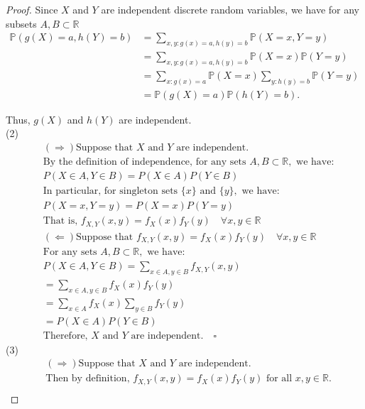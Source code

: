 \documentclass[letterpaper, 11pt]{article}
\newcommand{\1}{\mathds{1}}	%
\theoremstyle{definition}
\begin{document}
\begin{proof}
    Since \(X\) and \(Y\) are independent discrete random variables, we have for any subsets \(A,B \subset \mathbb{R}\)
    \begin{align*}
        \mathbb{P}(g(X) = a, h(Y) = b) &= \sum_{x,y: g(x)=a,h(y)=b} \mathbb{P}(X = x, Y = y) \\
        &= \sum_{x,y: g(x)=a,h(y)=b} \mathbb{P}(X = x)\mathbb{P}(Y = y) \\
        &= \sum_{x: g(x)=a} \mathbb{P}(X = x) \sum_{y: h(y)=b} \mathbb{P}(Y = y) \\
        &= \mathbb{P}(g(X) = a)\mathbb{P}(h(Y) = b).
        \end{align*}

Thus, \(g(X)\) and \(h(Y)\) are independent.
\\(2)
\begin{align*}
&(\Rightarrow) \text{Suppose that } X \text{ and } Y \text{ are independent.}\\
&\text{By the definition of independence, for any sets } A, B \subset \mathbb{R}, \text{ we have:}\\
&P(X \in A, Y \in B) = P(X \in A)P(Y \in B)\\
&\text{In particular, for singleton sets } \{x\} \text{ and } \{y\}, \text{ we have:}\\
&P(X = x, Y = y) = P(X = x)P(Y = y)\\
&\text{That is, } f_{X,Y}(x,y) = f_X(x)f_Y(y) \quad \forall x,y \in \mathbb{R}\\
&(\Leftarrow) \text{Suppose that } f_{X,Y}(x,y) = f_X(x)f_Y(y) \quad \forall x,y \in \mathbb{R}\\
&\text{For any sets } A, B \subset \mathbb{R}, \text{ we have:}\\
&P(X \in A, Y \in B) = \sum_{x \in A, y \in B} f_{X,Y}(x,y)\\
&= \sum_{x \in A, y \in B} f_X(x)f_Y(y)\\
&= \sum_{x \in A} f_X(x) \sum_{y \in B} f_Y(y)\\
&= P(X \in A)P(Y \in B)\\
&\text{Therefore, } X \text{ and } Y \text{ are independent.} \quad \square
\end{align*}
(3)
\begin{align*}
&(\Rightarrow) \text{Suppose that } X \text{ and } Y \text{ are independent.}\\
&\text{Then by definition, } f_{X,Y}(x,y) = f_X(x)f_Y(y) \text{ for all } x, y \in \mathbb{R}.\\

\end{align*}
\end{proof}
\end{document}
